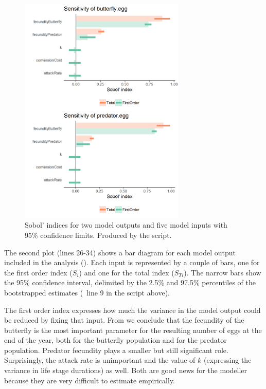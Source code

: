 \begin{figure} 
\centering
\includegraphics[width=0.7\textwidth]{graphics/sensitivity-analysis-pred-prey-3}
\caption{Sobol' indices for two model outputs and five model inputs with 95\% confidence limits. Produced by the  script.}
\label{fig:sensitivity-analysis-pred-prey-3}
\end{figure}

The second plot (lines 26-34) shows a bar diagram for each model output included in the analysis  (). Each input is represented by a couple of bars, one for the first order index ($S_i$) and one for the total index ($S_{Ti}$). The narrow bars show the 95\% confidence interval, delimited by the 2.5\% and 97.5\% percentiles of the bootstrapped estimates (\cf\ line 9 in the script above).

The first order index expresses how much the variance in the model output could be reduced by fixing that input. From  we conclude that the fecundity of the butterfly is the most important parameter for the resulting number of eggs at the end of the year, both for the butterfly population and for the predator population. Predator fecundity plays a smaller but still significant role. Surprisingly, the attack rate is unimportant and the value of $k$ (expressing the variance in life stage durations) as well. Both are good news for the modeller because they are very difficult to estimate empirically.


